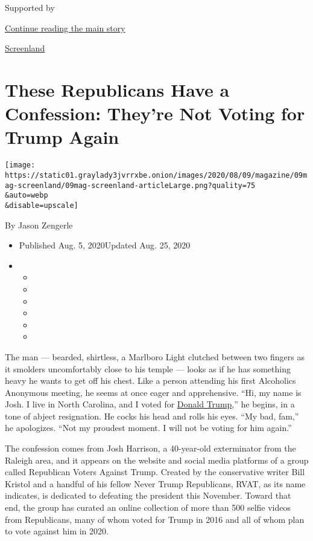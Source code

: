 Supported by

\protect\hyperlink{after-sponsor}{Continue reading the main story}

\href{/column/screenland}{Screenland}

\hypertarget{these-republicans-have-a-confession-theyre-not-voting-for-trump-again}{%
\section{These Republicans Have a Confession: They're Not Voting for
Trump
Again}\label{these-republicans-have-a-confession-theyre-not-voting-for-trump-again}}

\texttt{[image: https://static01.graylady3jvrrxbe.onion/images/2020/08/09/magazine/09mag-screenland/09mag-screenland-articleLarge.png?quality=75\\\&auto=webp\\\&disable=upscale]}

By Jason Zengerle

\begin{itemize}
\item
  Published Aug. 5, 2020Updated Aug. 25, 2020
\item
  \begin{itemize}
  \item
  \item
  \item
  \item
  \item
  \item
  \end{itemize}
\end{itemize}

The man --- bearded, shirtless, a Marlboro Light clutched between two
fingers as it smolders uncomfortably close to his temple --- looks as if
he has something heavy he wants to get off his chest. Like a person
attending his first Alcoholics Anonymous meeting, he seems at once eager
and apprehensive. ``Hi, my name is Josh. I live in North Carolina, and I
voted for
\href{https://www.nytimes3xbfgragh.onion/2020/08/25/us/politics/trump-reelection-supporters.html}{Donald
Trump},'' he begins, in a tone of abject resignation. He cocks his head
and rolls his eyes. ``My bad, fam,'' he apologizes. ``Not my proudest
moment. I will not be voting for him again.''

The confession comes from Josh Harrison, a 40-year-old exterminator from
the Raleigh area, and it appears on the website and social media
platforms of a group called Republican Voters Against Trump. Created by
the conservative writer Bill Kristol and a handful of his fellow Never
Trump Republicans, RVAT, as its name indicates, is dedicated to
defeating the president this November. Toward that end, the group has
curated an online collection of more than 500 selfie videos from
Republicans, many of whom voted for Trump in 2016 and all of whom plan
to vote against him in 2020.

